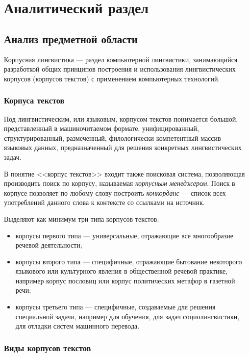 \section{Аналитический раздел}

\subsection{Анализ предметной области}

Корпусная лингвистика --- раздел компьютерной лингвистики, занимающийся разработкой общих принципов построения и использования лингвистических корпусов (корпусов текстов) с применением компьютерных технологий.~\cite[с. 11]{cl2022}

\subsubsection{Корпуса текстов}

Под лингвистическим, или языковым, корпусом текстов понимается большой, представленный в машиночитаемом формате, унифицированный, структурированный, размеченный, филологически компетентный массив языковых данных, предназначенный для решения конкретных лингвистических задач.~\cite[с. 11]{cl2022}

В понятие <<корпус текстов>> входит также поисковая система, позволяющая производить поиск по корпусу, называемая \textit{корпусным менеджером}.
Поиск в корпусе позволяет по любому слову построить \textit{конкорданс} --- список всех употреблений данного слова к контексте со ссылками на источник.~\cite[с. 12]{cl2022}

Выделяют как минимум три типа корпусов текстов:
\begin{itemize}
    \item корпусы первого типа — универсальные, отражающие все многообразие речевой деятельности;
    \item корпусы второго типа — специфичные, отражающие бытование некоторого языкового или культурного явления в общественной речевой практике, например корпус пословиц или корпус политических метафор в газетной речи;
    \item корпусы третьего типа — специфичные, создаваемые для решения специальной задачи, например для обучения, для задач социолингвистики, для отладки систем машинного перевода.~\cite[с. 12]{cl2022}
\end{itemize}

\subsubsection*{Виды корпусов текстов}

